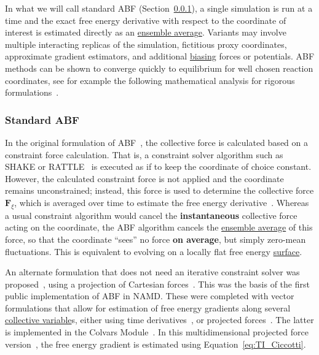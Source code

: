 \documentclass[9pt,review]{livecoms}
\newcommand{\vF}{\mathbf{F}}
\begin{document}
In what we will call standard ABF (Section~\ref{sec:ABF_standard}), a single simulation is run at a time and the exact free energy derivative with respect to the coordinate of interest is estimated directly as an \hyperlink{ref:ensemble_average} {ensemble average}.
Variants may involve multiple interacting replicas of the simulation, fictitious proxy coordinates, approximate gradient estimators, and additional \hyperlink{ref:biasingE} {biasing} forces or potentials. ABF methods can be shown to converge quickly to equilibrium for well chosen reaction coordinates, see for example the following mathematical analysis for rigorous formulations~\cite{lelievre-rousset-stoltz-08,benaim-brehier-monmarche-20}.

\subsubsection{Standard ABF}
\label{sec:ABF_standard}
In the original formulation of ABF~\cite{Darve2000, Darve2001, Darve2002}, the collective force is calculated based on a constraint force calculation. That is, a constraint solver algorithm such as SHAKE or RATTLE~\cite{Ryckaert1977,Andersen1983} is executed as if to keep the coordinate of choice constant.
However, the calculated constraint force is not applied and the coordinate remains unconstrained; instead, this force is used to determine the collective force $\vF_\xi$, which is averaged over time to estimate the free energy derivative~\cite{Darve2001}.
Whereas a usual constraint algorithm would cancel the \textbf{instantaneous} collective force acting on the coordinate, the ABF algorithm cancels the \hyperlink{ref:ensemble_average} {ensemble average} of this force, so that the coordinate ``sees'' no force \textbf{on average}, but simply zero-mean fluctuations. This is equivalent to evolving on a locally flat free energy \hyperlink{ref:FES} {surface}.


An alternate formulation that does not need an iterative constraint solver was proposed~\cite{Henin2004}, using a projection of Cartesian forces~\cite{denOtter2000}. This was the basis of the first public implementation of ABF in NAMD.
These were completed with vector formulations that allow for estimation of free energy gradients along several \hyperlink{ref:CV} {collective variable}s, either using time derivatives~\cite{Darve2008}, or projected forces~\cite{Henin2010a}.
The latter is implemented in the Colvars Module~\cite{Fiorin2013}.
In this multidimensional projected force version~\cite{Henin2010a}, the free energy gradient is estimated using Equation~\ref{eq:TI_Ciccotti}.
\end{document}
